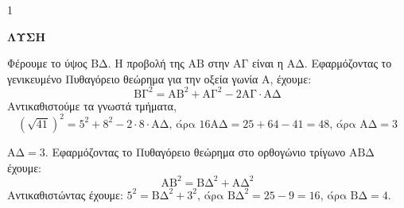 \begin{ylh}{1}
    \item [Ύλη από εικόνα]
\end{ylh}

\begin{figure} %
    \centering
\end{figure}

\noindent\textbf{ΛΥΣΗ}

\begin{alist}
    \item Φέρουμε το ύψος $\text{ΒΔ}$. Η προβολή της $\text{ΑΒ}$ στην $\text{ΑΓ}$ είναι η $\text{ΑΔ}$.
    Εφαρμόζοντας το γενικευμένο Πυθαγόρειο θεώρημα για την οξεία γωνία $\text{Α}$, έχουμε:
    \[
    \text{ΒΓ}^2 = \text{ΑΒ}^2 + \text{ΑΓ}^2 - 2\text{ΑΓ} \cdot \text{ΑΔ}
    \]
    Αντικαθιστούμε τα γνωστά τμήματα,
    \[
    (\sqrt{41})^2 = 5^2 + 8^2 - 2 \cdot 8 \cdot \text{ΑΔ} \text{, άρα } 16\text{ΑΔ} = 25+64-41=48 \text{, άρα } \text{ΑΔ} = 3
    \]

    \item $\text{ΑΔ} = 3$.
    Εφαρμόζοντας το Πυθαγόρειο θεώρημα στο ορθογώνιο τρίγωνο $\text{ΑΒΔ}$ έχουμε:
    \[
    \text{ΑΒ}^2 = \text{ΒΔ}^2 + \text{ΑΔ}^2
    \]
    Αντικαθιστώντας έχουμε: $5^2 = \text{ΒΔ}^2 + 3^2 \text{, άρα } \text{ΒΔ}^2 = 25-9=16 \text{, άρα } \text{ΒΔ} = 4$.
\end{alist}